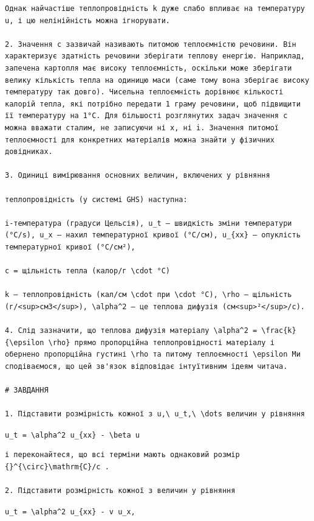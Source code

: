 \documentclass[
  ukrainian,
]{article}
\begin{document}
\begin{verbatim}
Однак найчастіше теплопровідність k дуже слабо впливає на температуру u, і цю нелінійність можна ігнорувати.

2. Значення c зазвичай називають питомою теплоємністю речовини. Він характеризує здатність речовини зберігати теплову енергію. Наприклад, запечена картопля має високу теплоємність, оскільки може зберігати велику кількість тепла на одиницю маси (саме тому вона зберігає високу температуру так довго). Чисельна теплоємність дорівнює кількості калорій тепла, які потрібно передати 1 граму речовини, щоб підвищити її температуру на 1°C. Для більшості розглянутих задач значення c можна вважати сталим, не записуючи ні x, ні i. Значення питомої теплоємності для конкретних матеріалів можна знайти у фізичних довідниках.

3. Одиниці вимірювання основних величин, включених у рівняння

теплопровідність (у системі GHS) наступна:

i-температура (градуси Цельсія), u_t — швидкість зміни температури (°C/s), u_x — нахил температурної кривої (°C/см), u_{xx} — опуклість температурної кривої (°C/см²),

c = щільність тепла (калор/г \cdot °C)

k — теплопровідність (кал/см \cdot при \cdot °C), \rho — щільність (г/<sup>см3</sup>), \alpha^2 — це теплова дифузія (см<sup>²</sup>/с).

4. Слід зазначити, що теплова дифузія матеріалу \alpha^2 = \frac{k}{\epsilon \rho} прямо пропорційна теплопровідності матеріалу і обернено пропорційна густині \rho та питому теплоємності \epsilon Ми сподіваємося, що цей зв'язок відповідає інтуїтивним ідеям читача.

# ЗАВДАННЯ

1. Підставити розмірність кожної з u,\ u_t,\ \dots величин у рівняння
\end{verbatim}

\texttt{u\_t\ =\ \textbackslash{}alpha\^{}2\ u\_\{xx\}\ -\ \textbackslash{}beta\ u}

\begin{verbatim}
і переконайтеся, що всі терміни мають однаковий розмір {}^{\circ}\mathrm{C}/c .

2. Підставити розмірність кожної з величин у рівняння
\end{verbatim}

\texttt{u\_t\ =\ \textbackslash{}alpha\^{}2\ u\_\{xx\}\ -\ v\ u\_x,}
\end{document}
